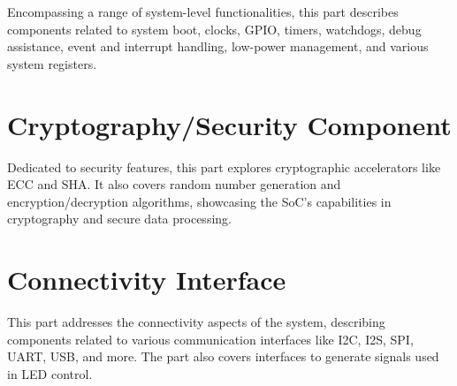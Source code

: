 \documentclass[openany, 10pt]{book}
\begin{document}

Encompassing a range of system-level functionalities, this part describes components related to system boot, clocks, GPIO, timers, watchdogs, debug assistance, event and interrupt handling, low-power management, and various system registers.







\part{Cryptography/Security Component}

Dedicated to security features, this part explores cryptographic accelerators like ECC and SHA. It also covers random number generation and encryption/decryption algorithms, showcasing the SoC’s capabilities in cryptography and secure data processing.






\part{Connectivity Interface}


This part addresses the connectivity aspects of the system, describing components related to various communication interfaces like I2C, I2S, SPI, UART, USB, and more. The part also covers interfaces to generate signals used in LED control.






\end{document}
